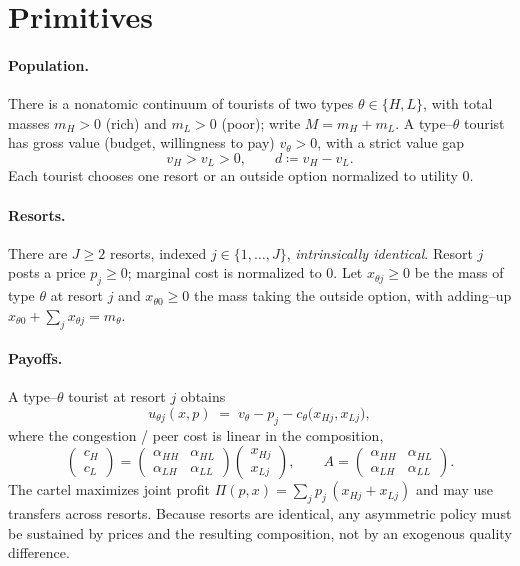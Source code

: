 \documentclass[11pt]{article}
\theoremstyle{plain}
\theoremstyle{definition}
\theoremstyle{remark}
\newcommand{\mH}{m_{H}}
\newcommand{\mL}{m_{L}}
\newcommand{\vH}{v_{H}}
\newcommand{\vL}{v_{L}}
\newcommand{\aHH}{\alpha_{HH}}
\newcommand{\aHL}{\alpha_{HL}}
\newcommand{\aLH}{\alpha_{LH}}
\newcommand{\aLL}{\alpha_{LL}}
\begin{document}
\section{Primitives}

\paragraph{Population.}
There is a nonatomic continuum of tourists of two types $\theta \in \{H,L\}$, with total
masses $\mH>0$ (rich) and $\mL>0$ (poor); write $M=\mH+\mL$. A type--$\theta$ tourist has
gross value (budget, willingness to pay) $v_\theta>0$, with a strict value gap
\begin{equation}
\vH > \vL > 0, \qquad d \coloneqq \vH-\vL .
\end{equation}
Each tourist chooses one resort or an outside option normalized to utility $0$.

\paragraph{Resorts.}
There are $J\ge 2$ resorts, indexed $j\in\{1,\dots,J\}$, \emph{intrinsically identical}.
Resort $j$ posts a price $p_j\ge 0$; marginal cost is normalized to $0$. Let $x_{\theta j}\ge0$
be the mass of type $\theta$ at resort $j$ and $x_{\theta 0}\ge 0$ the mass taking the outside
option, with adding--up $x_{\theta 0}+\sum_j x_{\theta j}=m_\theta$.

\paragraph{Payoffs.}
A type--$\theta$ tourist at resort $j$ obtains
\begin{equation}
u_{\theta j}(x,p) \;=\; v_\theta - p_j - c_\theta\!\big(x_{Hj},x_{Lj}\big),
\label{eq:payoff}
\end{equation}
where the congestion / peer cost is linear in the composition,
\begin{equation}
\begin{pmatrix} c_H \\ c_L \end{pmatrix}
=
\begin{pmatrix} \aHH & \aHL \\ \aLH & \aLL \end{pmatrix}
\begin{pmatrix} x_{Hj} \\ x_{Lj} \end{pmatrix},
\qquad
A=\begin{pmatrix}\aHH & \aHL\\ \aLH & \aLL\end{pmatrix}.
\label{eq:congestion}
\end{equation}
The cartel maximizes joint profit $\Pi(p,x)=\sum_j p_j\,(x_{Hj}+x_{Lj})$ and may use transfers
across resorts. Because resorts are identical, any asymmetric policy must be sustained by
prices and the resulting composition, not by an exogenous quality difference.
\end{document}

